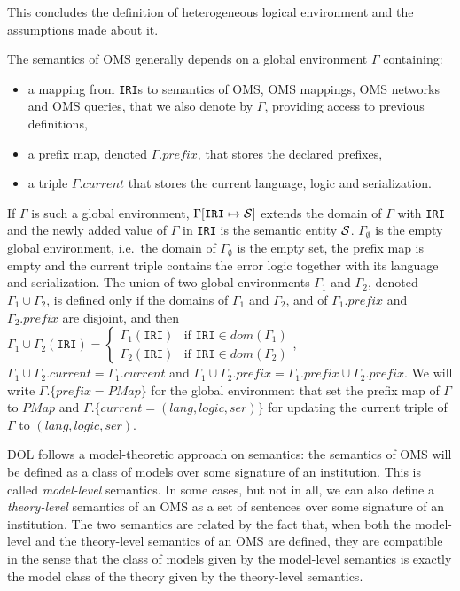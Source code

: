 \documentclass[10pt,fleqn,%
\ifpretendfinal
final%
\else
draft%
\fi,
]{scrreprt}
\newcommand*{\syntax}[1]{\texttt{#1}}
\newcommand{\prefix}{\mathit{prefix}}
\newcommand{\current}{\mathit{current}}
\newcommand{\PMap}{\mathit{PMap}}
\begin{document}
This concludes the definition of heterogeneous logical environment and the assumptions made about it.

\medskip

The semantics of OMS generally depends on a global environment
$\Gamma$ containing:
 \begin{itemize}
    \item a mapping from \syntax{IRI}s to semantics of OMS, OMS mappings, OMS networks and OMS queries, that 
               we also denote by $\Gamma$, providing access to previous definitions,
    \item a prefix map, denoted $\Gamma.\prefix$, that stores the declared prefixes,
    \item a triple $\Gamma.\current$ that stores the current language, logic and serialization. 
 \end{itemize}

If $\Gamma$ is such a global environment, $\Gamma[\syntax{IRI} \mapsto \cS]$
extends the domain of $\Gamma$ with \syntax{IRI} and
the newly added value of $\Gamma$ in \syntax{IRI} is the semantic entity ${\cal S}$.
 $\Gamma_\emptyset$ is the empty global environment, i.e.~the domain of $\Gamma_\emptyset$ is the empty set,
the prefix map is empty and the current triple contains the error logic together with its language and serialization.
The union of two global environments $\Gamma_1$ and $\Gamma_2$, 
denoted $\Gamma_1\cup\Gamma_2$, is defined only if the domains of $\Gamma_1$ and $\Gamma_2$,
and of $\Gamma_1.\prefix$ and $\Gamma_2.\prefix$ are disjoint, and then
$\Gamma_1\cup\Gamma_2(\syntax{IRI}) = \begin{cases}
\Gamma_1(\syntax{IRI})& \mbox{if } \syntax{IRI} \in dom(\Gamma_1) \\
\Gamma_2(\syntax{IRI})& \mbox{if } \syntax{IRI} \in dom(\Gamma_2)
\end{cases}$, $\Gamma_1\cup\Gamma_2.\current = \Gamma_1.\current$
and $\Gamma_1\cup\Gamma_2.\prefix = \Gamma_1.\prefix \cup \Gamma_2.\prefix$.
We will write $\Gamma.\{\prefix = \PMap\}$ for the global environment that set the prefix map of 
$\Gamma$ to $\PMap$ and $\Gamma.\{\current  = (lang, logic, ser)\}$ for updating the current triple of $\Gamma$ to
$(lang, logic, ser)$.


DOL follows a model-theoretic approach on semantics: the semantics of OMS will be defined as a class of models 
over some signature of an institution. This is called \emph{model-level}  semantics. In some cases, but not in all, we can also define
a \emph{theory-level} semantics of an OMS as a set of sentences over some signature of an institution. The two semantics are 
related by the fact that, when both the model-level and the theory-level semantics of an OMS are defined, they are compatible in the 
sense that the class of models given by the model-level semantics is exactly the model class of the theory given by the
theory-level semantics. 
\end{document}
